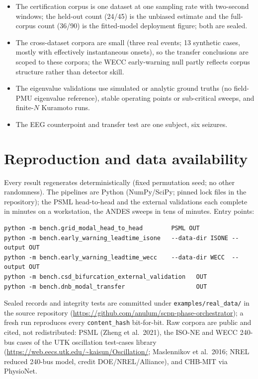 \documentclass[11pt]{article}
\newcommand{\code}[1]{\texttt{#1}}
\begin{document}
\begin{itemize}
  \item The certification corpus is one dataset at one sampling rate
    with two-second windows; the held-out count (24/45) is the unbiased
    estimate and the full-corpus count (36/90) is the fitted-model
    deployment figure; both are sealed.
  \item The cross-dataset corpora are small (three real events; 13
    synthetic cases, mostly with effectively instantaneous onsets), so
    the transfer conclusions are scoped to these corpora; the WECC
    early-warning null partly reflects corpus structure rather than
    detector skill.
  \item The eigenvalue validations use simulated or analytic ground
    truths (no field-PMU eigenvalue reference), stable operating points
    or sub-critical sweeps, and finite-$N$ Kuramoto runs.
  \item The EEG counterpoint and transfer test are one subject, six
    seizures.
\end{itemize}

\section{Reproduction and data availability}\label{sec:reproduction}

Every result regenerates deterministically (fixed permutation seed; no
other randomness). The pipelines are Python (NumPy/SciPy; pinned lock
files in the repository); the PSML head-to-head and the external
validations each complete in minutes on a workstation, the ANDES sweeps
in tens of minutes. Entry points:

\begin{verbatim}
python -m bench.grid_modal_head_to_head        PSML OUT
python -m bench.early_warning_leadtime_isone   --data-dir ISONE --output OUT
python -m bench.early_warning_leadtime_wecc    --data-dir WECC  --output OUT
python -m bench.csd_bifurcation_external_validation   OUT
python -m bench.dnb_modal_transfer                    OUT
\end{verbatim}

Sealed records and integrity tests are committed under
\code{examples/real\_data/} in the source repository
(\url{https://github.com/anulum/scpn-phase-orchestrator}); a fresh run
reproduces every \code{content\_hash} bit-for-bit. Raw corpora are
public and cited, not redistributed: PSML (Zheng et al.\ 2021), the
ISO-NE and WECC 240-bus cases of the UTK oscillation test-cases library
(\url{https://web.eecs.utk.edu/~kaisun/Oscillation/}; Maslennikov et
al.\ 2016; NREL reduced 240-bus model, credit DOE/NREL/Alliance), and
CHB-MIT via PhysioNet.
\end{document}
